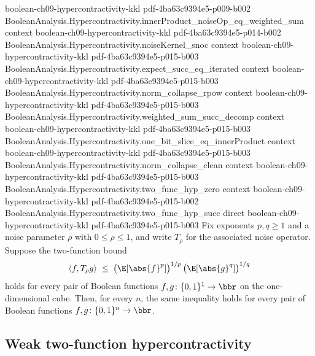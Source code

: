 \begin{theorem}
  {boolean-ch09-hypercontractivity-kkl}
  {pdf-4ba63c9394e5-p009-b002}
\proofstep
  {BooleanAnalysis.Hypercontractivity.innerProduct_noiseOp_eq_weighted_sum}
  {context}
  {boolean-ch09-hypercontractivity-kkl}
  {pdf-4ba63c9394e5-p014-b002}
\proofstep
  {BooleanAnalysis.Hypercontractivity.noiseKernel_snoc}
  {context}
  {boolean-ch09-hypercontractivity-kkl}
  {pdf-4ba63c9394e5-p015-b003}
\proofstep
  {BooleanAnalysis.Hypercontractivity.expect_succ_eq_iterated}
  {context}
  {boolean-ch09-hypercontractivity-kkl}
  {pdf-4ba63c9394e5-p015-b003}
\proofstep
  {BooleanAnalysis.Hypercontractivity.norm_collapse_rpow}
  {context}
  {boolean-ch09-hypercontractivity-kkl}
  {pdf-4ba63c9394e5-p015-b003}
\proofstep
  {BooleanAnalysis.Hypercontractivity.weighted_sum_succ_decomp}
  {context}
  {boolean-ch09-hypercontractivity-kkl}
  {pdf-4ba63c9394e5-p015-b003}
\proofstep
  {BooleanAnalysis.Hypercontractivity.one_bit_slice_eq_innerProduct}
  {context}
  {boolean-ch09-hypercontractivity-kkl}
  {pdf-4ba63c9394e5-p015-b003}
\proofstep
  {BooleanAnalysis.Hypercontractivity.norm_collapse_clean}
  {context}
  {boolean-ch09-hypercontractivity-kkl}
  {pdf-4ba63c9394e5-p015-b003}
\proofstep
  {BooleanAnalysis.Hypercontractivity.two_func_hyp_zero}
  {context}
  {boolean-ch09-hypercontractivity-kkl}
  {pdf-4ba63c9394e5-p015-b002}
\proofstep
  {BooleanAnalysis.Hypercontractivity.two_func_hyp_succ}
  {direct}
  {boolean-ch09-hypercontractivity-kkl}
  {pdf-4ba63c9394e5-p015-b003}
Fix exponents $p, q \ge 1$ and a noise parameter $\rho$ with $0 \le \rho \le 1$, and
write $T_\rho$ for the associated noise operator. Suppose the two-function bound
\[
\langle f, T_\rho g\rangle \;\le\;
\bigl(\E[\abs{f}^p]\bigr)^{1/p}\,\bigl(\E[\abs{g}^q]\bigr)^{1/q}
\]
holds for every pair of Boolean functions $f, g \colon \{0,1\}^1 \to \bbr$ on the
one-dimensional cube. Then, for every $n$, the same inequality holds for every pair of
Boolean functions $f, g \colon \{0,1\}^n \to \bbr$.
\end{theorem}

\subsection{Weak two-function hypercontractivity}

